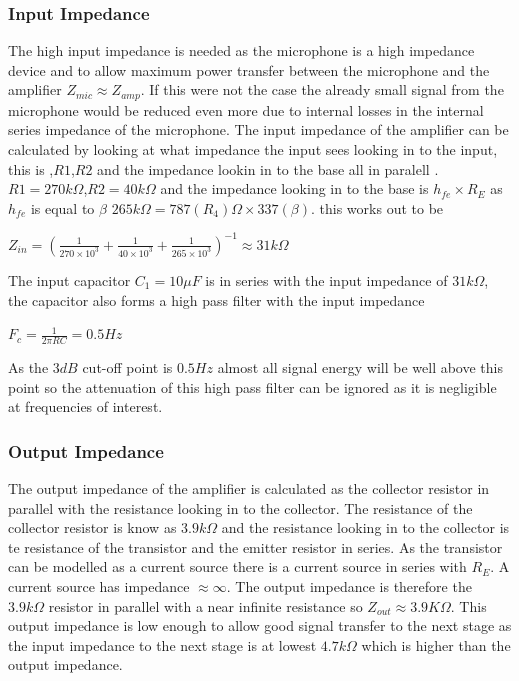 \documentclass[10pt,a4paper]{article}
\begin{document}
\subsubsection{Input Impedance}
The high input impedance is needed as the microphone is a high impedance device and to allow maximum power transfer between the microphone and the amplifier $Z_{mic} \approx Z_{amp}$. If this were not the case the already small signal from the microphone would be reduced even more due to internal losses in the internal series impedance of the microphone. The input impedance of the amplifier can be calculated by looking at what impedance the input sees looking in to the input, this is ,$R1$,$R2$ and the impedance lookin in to the base all in paralell \cite{ArtElectronics}. $R1 = 270k\Omega$,$R2 = 40k\Omega$ and the impedance looking in to the base is $h_{fe} \times R_E$ as $h_{fe}$ is equal to $\beta$ \cite{ArtElectronics} $265k\Omega= 787(R_4)\Omega \times 337(\beta)$.
this works out to be  

\begin{center}
\Huge

$Z_{in}= (\frac{1}{270\times 10^{3}} +\frac{1}{40\times 10^{3}} + \frac{1}{265 \times 10^{3}} )^{-1} \approx 31k\Omega$



\end{center}
The input capacitor $C_1 = 10\mu F$ is in series with the input impedance of $31k\Omega$, the capacitor also forms a high pass filter with the input impedance 
\begin{center}
\Huge

$F_c = \frac{1}{2\pi RC} = 0.5Hz$



\end{center}
\cite{ArtElectronics}
As the $3dB$ cut-off point is $0.5Hz$ almost all signal energy will be well above this point so the attenuation of this high pass filter can be ignored as it is negligible at frequencies of interest.
\subsubsection{Output Impedance}
The output impedance of the amplifier is calculated as the collector resistor in parallel with the resistance looking in to the collector. The resistance of the collector resistor is know as $3.9k\Omega$ and the resistance looking in to the collector is te resistance of the transistor and the emitter resistor in series. As the transistor can be modelled as a current source there is a current source in series with $R_E$. A current source has impedance $\approx \infty$. The output impedance is therefore the $3.9k\Omega$ resistor in parallel with a near infinite resistance so $Z_{out} \approx 3.9K\Omega$. This output impedance is low enough to allow good signal transfer to the next stage as the input impedance to the next stage is at lowest $4.7k\Omega$ which is higher than the output impedance.
\end{document}
